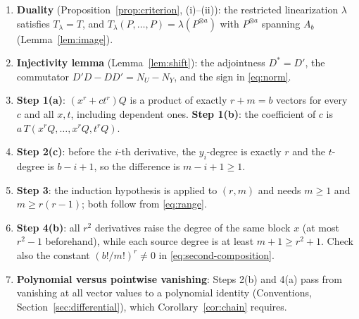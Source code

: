 \documentclass[11pt]{article}
\theoremstyle{remark}
\begin{document}
\begin{enumerate}[nosep]
\item \textbf{Duality} (Proposition~\ref{prop:criterion}, (i)--(ii)): the
restricted linearization $\lambda$ satisfies $T_\lambda=T$, and
$T_\lambda(P,\ldots,P)=\lambda(P^{\otimes a})$ with $P^{\otimes a}$ spanning
$A_b$ (Lemma~\ref{lem:image}).
\item \textbf{Injectivity lemma} (Lemma~\ref{lem:shift}): the adjointness
$D^*=D'$, the commutator $D'D-DD'=N_U-N_Y$, and the sign in
\eqref{eq:norm}.
\item \textbf{Step 1(a)}: $(x^r+ct^r)Q$ is a product of exactly $r+m=b$
vectors for every $c$ and all $x,t$, including dependent ones. \textbf{Step
1(b)}: the coefficient of $c$ is $a\,T(x^rQ,\ldots,x^rQ,t^rQ)$.
\item \textbf{Step 2(c)}: before the $i$-th derivative, the $y_i$-degree is
exactly $r$ and the $t$-degree is $b-i+1$, so the difference is
$m-i+1\ge1$.
\item \textbf{Step 3}: the induction hypothesis is applied to $(r,m)$ and
needs $m\ge1$ and $m\ge r(r-1)$; both follow from \eqref{eq:range}.
\item \textbf{Step 4(b)}: all $r^2$ derivatives raise the degree of the same
block $x$ (at most $r^2-1$ beforehand), while each source degree is at least
$m+1\ge r^2+1$. Check also the constant $(b!/m!)^r\ne0$ in
\eqref{eq:second-composition}.
\item \textbf{Polynomial versus pointwise vanishing}: Steps 2(b) and 4(a)
pass from vanishing at all vector values to a polynomial identity
(Conventions, Section~\ref{sec:differential}), which
Corollary~\ref{cor:chain} requires.
\end{enumerate}
\end{document}
